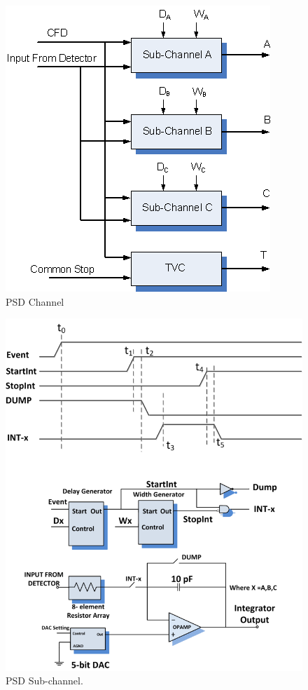 \documentclass[12pt,oneside,final]{siuethesis}
\theoremstyle{definition}
\begin{document}
\begin{figure}[htbp!]
	\centering
 	\includegraphics[scale=1.0,keepaspectratio=true]{./ch1_figures/PSD_channel.png}
 	\caption{PSD Channel}
 	\label{FIG:PSD_CHANNEL}
\end{figure}


\begin{figure}[htbp!]
	\centering
 	\includegraphics[scale=1.3,keepaspectratio=true]{./ch1_figures/PSD_sub_channel.png}
 	\caption{PSD Sub-channel.}
 	\label{FIG:PSD_SUB_CHANNEL}
\end{figure}
\end{document}
